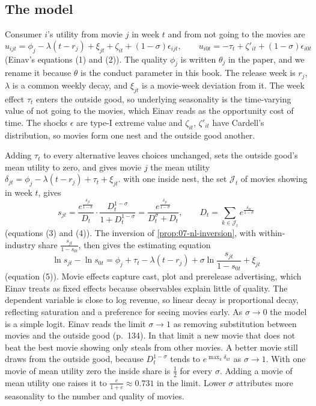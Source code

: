 \subsection{The model}\label{sec:07-einav-model}

Consumer $i$'s utility from movie $j$ in week $t$ and from not going to the movies are
\begin{equation}\label{eq:07-einav-u}
u_{ijt} = \phi_j - \lambda(t - r_j) + \xi_{jt} + \zeta_{it} + (1-\sigma)\epsilon_{ijt},
\qquad
u_{i0t} = -\tau_t + \zeta'_{it} + (1-\sigma)\epsilon_{i0t}
\end{equation}
(Einav's equations (1) and (2)). The quality $\phi_j$ is written $\theta_j$ in the paper, and we rename it because
$\theta$ is the conduct parameter in this book. The release week is $r_j$, $\lambda$ is a common weekly decay,
and $\xi_{jt}$ is a movie-week deviation from it. The week effect $\tau_t$ enters the outside good, so underlying
seasonality is the time-varying value of not going to the movies, which Einav reads as the opportunity cost of
time. The shocks $\epsilon$ are type-I extreme value and $\zeta_{it}$, $\zeta'_{it}$ have Cardell's distribution, so
movies form one nest and the outside good another.

Adding $\tau_t$ to every alternative leaves choices unchanged, sets the outside good's mean utility to zero, and
gives movie $j$ the mean utility $\delta_{jt} = \phi_j - \lambda(t - r_j) + \tau_t + \xi_{jt}$.
 with one inside nest, the set $\mathcal{J}_t$ of movies showing in week $t$, gives
\begin{equation*}
s_{jt} = \frac{e^{\frac{\delta_{jt}}{1-\sigma}}}{D_t}\cdot\frac{D_t^{1-\sigma}}{1 + D_t^{1-\sigma}}
= \frac{e^{\frac{\delta_{jt}}{1-\sigma}}}{D_t^{\sigma} + D_t},
\qquad
D_t = \sum_{k \in \mathcal{J}_t} e^{\frac{\delta_{kt}}{1-\sigma}}
\end{equation*}
(equations (3) and (4)). The inversion of \cref{prop:07-nl-inversion}, with within-industry share
$\frac{s_{jt}}{1-s_{0t}}$, then gives the estimating equation
\begin{equation}\label{eq:07-einav-est}
\ln s_{jt} - \ln s_{0t} = \phi_j + \tau_t - \lambda(t - r_j) + \sigma\ln\frac{s_{jt}}{1 - s_{0t}} + \xi_{jt}
\end{equation}
(equation (5)). Movie effects capture cast, plot and prerelease advertising, which Einav treats as fixed effects
because observables explain little of quality. The dependent variable is close to log revenue, so linear decay is
proportional decay, reflecting saturation and a preference for seeing movies early. As $\sigma \to 0$ the model is
a simple logit. Einav reads the limit $\sigma \to 1$ as removing substitution between movies and the outside good
(p.~134). In that limit a new movie that does not beat the best movie showing only steals from other movies. A
better movie still draws from the outside good, because $D_t^{1-\sigma}$ tends to $e^{\max_k \delta_{kt}}$ as
$\sigma \to 1$. With one movie of mean utility zero the inside share is $\frac{1}{2}$ for every $\sigma$. Adding a
movie of mean utility one raises it to $\frac{e}{1+e} \approx 0.731$ in the limit. Lower $\sigma$ attributes more seasonality to the number and quality of movies.

